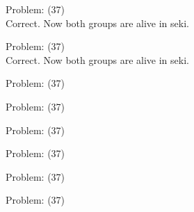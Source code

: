 \documentclass[11pt]{article}
\begin{document}
\begin{minipage}[t]{0.5\textwidth}
  {\centering
  
Problem: (37)\\
Correct. Now both groups are alive in seki.\\
  }
\end{minipage}
\begin{minipage}[t]{0.5\textwidth}
  {\centering
  
Problem: (37)\\
Correct. Now both groups are alive in seki.\\
  }
\end{minipage}
\begin{minipage}[t]{0.5\textwidth}
  {\centering
  
Problem: (37)\\
  }
\end{minipage}
\begin{minipage}[t]{0.5\textwidth}
  {\centering
  
Problem: (37)\\
  }
\end{minipage}
\begin{minipage}[t]{0.5\textwidth}
  {\centering
  
Problem: (37)\\
  }
\end{minipage}
\begin{minipage}[t]{0.5\textwidth}
  {\centering
  
Problem: (37)\\
  }
\end{minipage}
\begin{minipage}[t]{0.5\textwidth}
  {\centering
  
Problem: (37)\\
  }
\end{minipage}
\begin{minipage}[t]{0.5\textwidth}
  {\centering
  
Problem: (37)\\
  }
\end{minipage}
\end{document}
